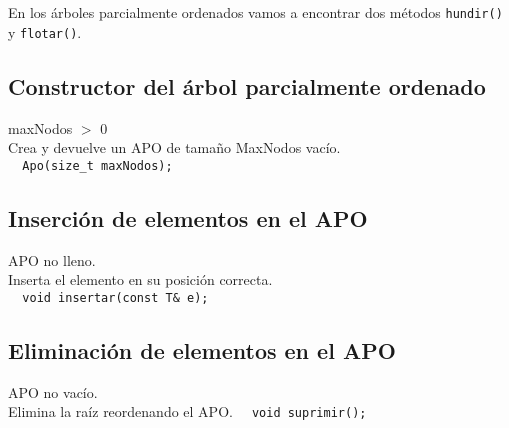 En los árboles parcialmente ordenados vamos a encontrar dos métodos \texttt{hundir()} y \texttt{flotar()}.

\subsection*{Constructor del árbol parcialmente ordenado}
 maxNodos $>$ 0\\
 Crea y devuelve un APO de tamaño MaxNodos vacío.\\
\verb|  Apo(size_t maxNodos);|

\subsection*{Inserción de elementos en el APO}
 APO no lleno.\\
 Inserta el elemento en su posición correcta.\\
\verb|  void insertar(const T& e);|
\subsection*{Eliminación de elementos en el APO}
 APO no vacío.\\
 Elimina la raíz reordenando el APO.
\verb|  void suprimir();|
